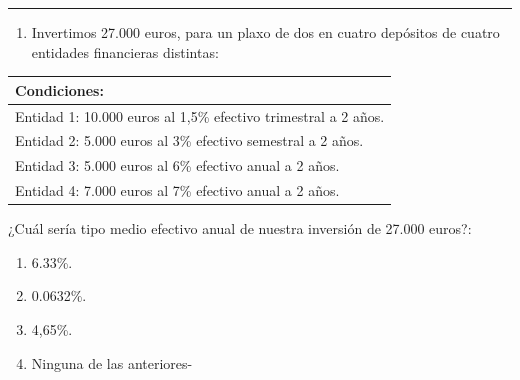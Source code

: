 \documentclass[
  letterpaper,
  DIV=11,
  numbers=noendperiod]{scrreprt}
\providecommand{\tightlist}{%
  \setlength{\itemsep}{0pt}\setlength{\parskip}{0pt}}\usepackage{longtable,booktabs,array}
\begin{document}
\begin{center}\rule{0.5\linewidth}{0.5pt}\end{center}

\begin{enumerate}
\def\labelenumi{\arabic{enumi}.}
\setcounter{enumi}{25}
\tightlist
\item
  Invertimos 27.000 euros, para un plaxo de dos en cuatro depósitos de
  cuatro entidades financieras distintas:
\end{enumerate}

\begin{longtable}[]{@{}l@{}}
\toprule()
\textbf{Condiciones:} \\
\midrule()
\endhead
Entidad 1: 10.000 euros al 1,5\% efectivo trimestral a 2 años. \\
Entidad 2: 5.000 euros al 3\% efectivo semestral a 2 años. \\
Entidad 3: 5.000 euros al 6\% efectivo anual a 2 años. \\
Entidad 4: 7.000 euros al 7\% efectivo anual a 2 años. \\
\bottomrule()
\end{longtable}

¿Cuál sería tipo medio efectivo anual de nuestra inversión de 27.000
euros?:

\begin{enumerate}
\def\labelenumi{\alph{enumi})}
\item
  6.33\%.
\item
  0.0632\%.
\item
  4,65\%.
\item
  Ninguna de las anteriores-
\end{enumerate}
\end{document}
